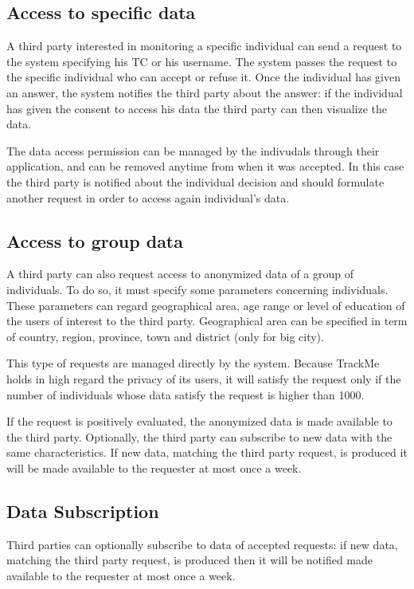 \subsection{Access to specific data}
A third party interested in monitoring a specific individual can send a request to the system specifying his TC or his username.
The system passes the request to the specific individual who can accept or refuse it.
Once the individual has given an answer, the system notifies the third party about the answer: if the individual has given the consent to access his data the third party can then visualize the data.

The data access permission can be managed by the indivudals through their application, and can be removed anytime from when it was accepted. 
In this case the third party is notified about the individual decision and should formulate another request in order to access again individual's data. 




\subsection{Access to group data}
A third party can also request access to anonymized data of a group of individuals.
To do so, it must specify some parameters concerning individuals. These parameters can regard geographical area, age range or level of education of the users of interest to the third party.
Geographical area can be specified in term of country, region, province, town and district (only for big city).

This type of requests are managed directly by the system. Because TrackMe holds in high regard the privacy of its users, it will satisfy the request only if the number of individuals whose data satisfy the request is higher than 1000.

If the request is positively evaluated, the anonymized data is made available to the third party.
Optionally, the third party can subscribe to new data with the same characteristics. If new data, matching the third party request, is produced it will be made available to the requester at most once a week.

\subsection{Data Subscription}
Third parties can optionally subscribe to data of accepted requests: if new data, matching the third party request, is produced then it will be notified made available to the requester at most once a week.

